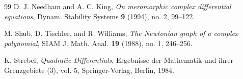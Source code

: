 \documentclass[11pt,reqno]{amsart}
\theoremstyle{definition}
\theoremstyle{remark}
\begin{document}
\begin{thebibliography}{99}
D. J. Needham and A. C. King,
\emph{On meromorphic complex differential equations},
Dynam. Stability Systems \textbf{9} (1994), no. 2, 99--122.

M. Shub, D. Tischler, and R. Williams,
\emph{The Newtonian graph of a complex polynomial},
SIAM J. Math. Anal. \textbf{19} (1988), no. 1, 246--256.

K. Strebel,
\emph{Quadratic Differentials},
Ergebnisse der Mathematik und ihrer Grenzgebiete (3), vol. 5, Springer-Verlag, Berlin, 1984.

\end{thebibliography}
\end{document}
